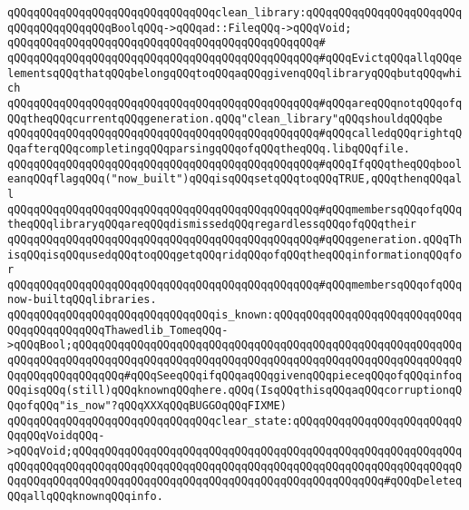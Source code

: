 \newline
\newline
\verb|qQQqqQQqqQQqqQQqqQQqqQQqqQQqqQQqclean_library:qQQqqQQqqQQqqQQqqQQqqQQqqQQqqQQqqQQqqQQqBoolqQQq->qQQqad::FileqQQq->qQQqVoid;|\newline
\verb|qQQqqQQqqQQqqQQqqQQqqQQqqQQqqQQqqQQqqQQqqQQqqQQq#|\newline
\verb|qQQqqQQqqQQqqQQqqQQqqQQqqQQqqQQqqQQqqQQqqQQqqQQq#qQQqEvictqQQqallqQQqelementsqQQqthatqQQqbelongqQQqtoqQQqaqQQqgivenqQQqlibraryqQQqbutqQQqwhich|\newline
\verb|qQQqqQQqqQQqqQQqqQQqqQQqqQQqqQQqqQQqqQQqqQQqqQQq#qQQqareqQQqnotqQQqofqQQqtheqQQqcurrentqQQqgeneration.qQQq"clean_library"qQQqshouldqQQqbe|\newline
\verb|qQQqqQQqqQQqqQQqqQQqqQQqqQQqqQQqqQQqqQQqqQQqqQQq#qQQqcalledqQQqrightqQQqafterqQQqcompletingqQQqparsingqQQqofqQQqtheqQQq.libqQQqfile.|\newline
\verb|qQQqqQQqqQQqqQQqqQQqqQQqqQQqqQQqqQQqqQQqqQQqqQQq#qQQqIfqQQqtheqQQqbooleanqQQqflagqQQq("now_built")qQQqisqQQqsetqQQqtoqQQqTRUE,qQQqthenqQQqall|\newline
\verb|qQQqqQQqqQQqqQQqqQQqqQQqqQQqqQQqqQQqqQQqqQQqqQQq#qQQqmembersqQQqofqQQqtheqQQqlibraryqQQqareqQQqdismissedqQQqregardlessqQQqofqQQqtheir|\newline
\verb|qQQqqQQqqQQqqQQqqQQqqQQqqQQqqQQqqQQqqQQqqQQqqQQq#qQQqgeneration.qQQqThisqQQqisqQQqusedqQQqtoqQQqgetqQQqridqQQqofqQQqtheqQQqinformationqQQqfor|\newline
\verb|qQQqqQQqqQQqqQQqqQQqqQQqqQQqqQQqqQQqqQQqqQQqqQQq#qQQqmembersqQQqofqQQqnow-builtqQQqlibraries.|\newline
\newline
\verb|qQQqqQQqqQQqqQQqqQQqqQQqqQQqqQQqis_known:qQQqqQQqqQQqqQQqqQQqqQQqqQQqqQQqqQQqqQQqqQQqThawedlib_TomeqQQq->qQQqBool;qQQqqQQqqQQqqQQqqQQqqQQqqQQqqQQqqQQqqQQqqQQqqQQqqQQqqQQqqQQqqQQqqQQqqQQqqQQqqQQqqQQqqQQqqQQqqQQqqQQqqQQqqQQqqQQqqQQqqQQqqQQqqQQqqQQqqQQqqQQqqQQqqQQq#qQQqSeeqQQqifqQQqaqQQqgivenqQQqpieceqQQqofqQQqinfoqQQqisqQQq(still)qQQqknownqQQqhere.qQQq(IsqQQqthisqQQqaqQQqcorruptionqQQqofqQQq"is_now"?qQQqXXXqQQqBUGGOqQQqFIXME)|\newline
\verb|qQQqqQQqqQQqqQQqqQQqqQQqqQQqqQQqclear_state:qQQqqQQqqQQqqQQqqQQqqQQqqQQqqQQqVoidqQQq->qQQqVoid;qQQqqQQqqQQqqQQqqQQqqQQqqQQqqQQqqQQqqQQqqQQqqQQqqQQqqQQqqQQqqQQqqQQqqQQqqQQqqQQqqQQqqQQqqQQqqQQqqQQqqQQqqQQqqQQqqQQqqQQqqQQqqQQqqQQqqQQqqQQqqQQqqQQqqQQqqQQqqQQqqQQqqQQqqQQqqQQqqQQqqQQqqQQq#qQQqDeleteqQQqallqQQqknownqQQqinfo.|\newline
